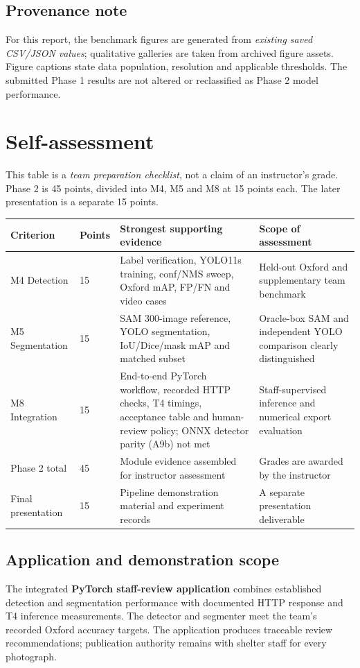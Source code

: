 \documentclass[11pt,a4paper]{article}
\begin{document}
\subsection*{Provenance note}
For this report, the benchmark figures are generated from \emph{existing saved CSV/JSON values}; qualitative galleries are taken from archived figure assets. Figure captions state data population, resolution and applicable thresholds. The submitted Phase 1 results are not altered or reclassified as Phase 2 model performance.
\clearpage

\section{Self-assessment}
This table is a \emph{team preparation checklist}, not a claim of an instructor's grade. Phase 2 is 45 points, divided into M4, M5 and M8 at 15 points each. The later presentation is a separate 15 points.

{\small\begin{tabularx}{\linewidth}{@{}P{3.1cm} P{1.0cm} Y P{3.5cm}@{}}\toprule
Criterion & Points & Strongest supporting evidence & Scope of assessment\\\midrule
M4 Detection & 15 & Label verification, YOLO11s training, conf/NMS sweep, Oxford mAP, FP/FN and video cases & Held-out Oxford and supplementary team benchmark\\
M5 Segmentation & 15 & SAM 300-image reference, YOLO segmentation, IoU/Dice/mask mAP and matched subset & Oracle-box SAM and independent YOLO comparison clearly distinguished\\
M8 Integration & 15 & End-to-end PyTorch workflow, recorded HTTP checks, T4 timings, acceptance table and human-review policy; ONNX detector parity (A9b) not met & Staff-supervised inference and numerical export evaluation\\
\midrule
Phase 2 total & 45 & Module evidence assembled for instructor assessment & Grades are awarded by the instructor\\
Final presentation & 15 & Pipeline demonstration material and experiment records & A separate presentation deliverable\\\bottomrule\end{tabularx}}
\subsection*{Application and demonstration scope}
The integrated \textbf{PyTorch staff-review application} combines established detection and segmentation performance with documented HTTP response and T4 inference measurements. The detector and segmenter meet the team's recorded Oxford accuracy targets. The application produces traceable review recommendations; publication authority remains with shelter staff for every photograph.
\clearpage
\end{document}
